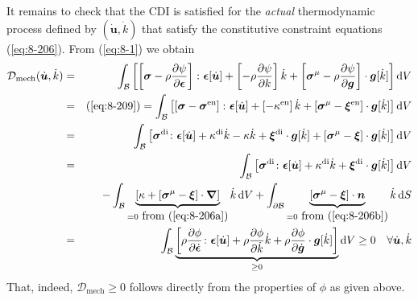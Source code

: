 It remains to check that the CDI is satisfied for the \emph{actual} thermodynamic process defined by $(\dot{\bm{u}},\dot{k})$ that satisfy the constitutive constraint equations (\ref{eq:8-206}). From (\ref{eq:8-1}) we obtain
\begin{eqnarray}
    {\mathcal D}_{\mathrm{mech}}(\dot{\bm{u}},\dot{k})
    &=&
    \int_{\mathcal{B}} \left[\left[\bm{\sigma} -\rho\frac{\partial \psi}{\partial \bm{\epsilon}}\right] \colon \bm{\epsilon}[\dot{\bm{u}}] + \left[- \rho\frac{\partial \psi}{\partial k}\right] \dot{k}
    + \left[\bm{\sigma}^{\mathrm{\mu}} -\rho\frac{\partial \psi}{\partial \bm{g}}\right] \cdot \bm{g}[\dot{k}] \right] \mathop{}\!\mathrm{d} V
    \nonumber \\
    &=& (\ref{eq:8-209}) =
    \int_{\mathcal{B}} \left[\left[\bm{\sigma} -\bm{\sigma}^{\mathrm{en}}\right] \colon \bm{\epsilon}[\dot{\bm{u}}] + \left[-\kappa^{\mathrm{en}}\right] \dot{k}
    + \left[\bm{\sigma}^{\mathrm{\mu}} - \bm{\xi}^{\mathrm{en}}\right] \cdot \bm{g}[\dot{k}] \right] \mathop{}\!\mathrm{d} V
    \nonumber \\
    &=&
    \int_{\mathcal{B}} \left[\bm{\sigma}^{\mathrm{di}}\colon \bm{\epsilon}[\dot{\bm{u}}] + \kappa^{\mathrm{di}}\dot{k} - \kappa\dot{k} + \bm{\xi}^{\mathrm{di}}\cdot\bm{g}[\dot{k}]
    + \left[\bm{\sigma}^{\mathrm{\mu}} - \bm{\xi}\right]\cdot\bm{g}[\dot{k}] \right] \mathop{}\!\mathrm{d} V
    \nonumber \\
    &=&
    \int_{\mathcal{B}} \left[\bm{\sigma}^{\mathrm{di}}\colon \bm{\epsilon}[\dot{\bm{u}}] + \kappa^{\mathrm{di}} \dot{k}
    + \bm{\xi}^{\mathrm{di}} \cdot \bm{g}[\dot{k}] \right] \mathop{}\!\mathrm{d} V
    \nonumber \\
    &&- \int_{\mathcal{B}} \underbrace{\left[\kappa + \left[\bm{\sigma}^{\mathrm{\mu}} - \bm{\xi}\right] \cdot \bm{\nabla}\right]}_{=0 \mbox{ from (\ref{eq:8-206a})}}\dot{k} \mathop{}\!\mathrm{d} V
    + \int_{\partial\mathcal{B}} \underbrace{\left[\bm{\sigma}^{\mathrm{\mu}} - \bm{\xi}\right]\cdot\bm{n}}_{=0 \mbox{ from (\ref{eq:8-206b})}} \dot{k} \mathop{}\!\mathrm{d} S
    \nonumber \\
    &=&
    \int_{\mathcal{B}} \underbrace{\left[\rho\frac{\partial \phi}{\partial \dot{\bm{\epsilon}}}\colon \bm{\epsilon}[\dot{\bm{u}}]
    + \rho\frac{\partial \phi}{\partial \dot{k}} \dot{k}
    + \rho\frac{\partial \phi}{\partial \dot{\bm{g}}} \cdot \bm{g}[\dot{k}] \right]}_{\geq 0} \mathop{}\!\mathrm{d} V
    \geq 0
    \quad \forall \dot{\bm{u}},\dot{k}
\label{eq:8-902}
\end{eqnarray}
That, indeed, ${\mathcal D}_{\mathrm{mech}}\geq 0$ follows directly from the properties of $\phi$ as given above.

